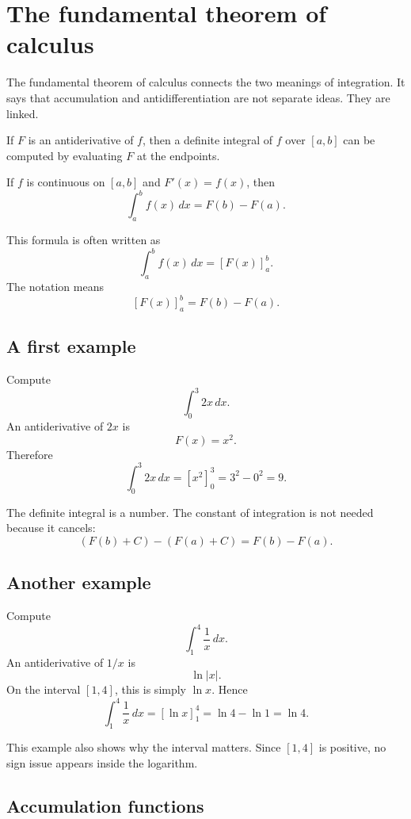 \section{The fundamental theorem of calculus}

The fundamental theorem of calculus connects the two meanings of integration. It says that accumulation and antidifferentiation are not separate ideas. They are linked.

If \(F\) is an antiderivative of \(f\), then a definite integral of \(f\) over \([a,b]\) can be computed by evaluating \(F\) at the endpoints.

\begin{theorembox}
If \(f\) is continuous on \([a,b]\) and \(F'(x)=f(x)\), then
\[
\int_a^b f(x)\,dx=F(b)-F(a).
\]
\end{theorembox}

This formula is often written as
\[
\int_a^b f(x)\,dx=\left[F(x)\right]_a^b.
\]
The notation means
\[
\left[F(x)\right]_a^b=F(b)-F(a).
\]

\subsection*{A first example}

\begin{examplebox}
Compute
\[
\int_0^3 2x\,dx.
\]
An antiderivative of \(2x\) is
\[
F(x)=x^2.
\]
Therefore
\[
\int_0^3 2x\,dx=\left[x^2\right]_0^3=3^2-0^2=9.
\]
\end{examplebox}

The definite integral is a number. The constant of integration is not needed because it cancels:
\[
(F(b)+C)-(F(a)+C)=F(b)-F(a).
\]

\subsection*{Another example}

\begin{examplebox}
Compute
\[
\int_1^4 \frac{1}{x}\,dx.
\]
An antiderivative of \(1/x\) is
\[
\ln|x|.
\]
On the interval \([1,4]\), this is simply \(\ln x\). Hence
\[
\int_1^4 \frac1x\,dx=\left[\ln x\right]_1^4=\ln4-\ln1=\ln4.
\]
\end{examplebox}

This example also shows why the interval matters. Since \([1,4]\) is positive, no sign issue appears inside the logarithm.

\subsection*{Accumulation functions}

